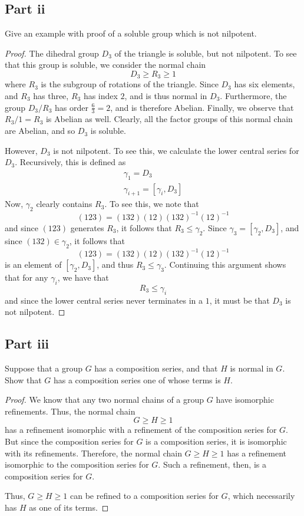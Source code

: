 \documentclass[12pt,reqno]{amsart}
\begin{document}
\subsection*{Part ii}
Give an example with proof of a soluble group which is not nilpotent.
\\
\begin{proof}
The dihedral group $D_3$ of the triangle is soluble, but not nilpotent. To see
    that this group is soluble, we consider the normal chain
    \[
        D_3 \geq R_3 \geq 1
    \]
    where $R_3$ is the subgroup of rotations of the triangle. Since $D_3$ has
    six elements, and $R_3$ has three, $R_3$ has index $2$, and is thus normal
    in $D_3$. Furthermore, the group $D_3/{R_3}$ has order $\frac{6}{3}=2$, and
    is therefore Abelian. Finally, we observe that $R_3/1 = R_3$ is Abelian as
    well. Clearly, all the factor groups of this normal chain are Abelian, and
    so $D_3$ is soluble.

    However, $D_3$ is not nilpotent. To see this, we calculate the lower central
    series for $D_3$. Recursively, this is defined as
    \[
        \begin{aligned}
        \gamma_1 = D_3\\
            \gamma_{i+1} = [\gamma_i,D_3]
        \end{aligned}
    \]
    Now, $\gamma_2$ clearly contains $R_3$. To see this, we note that
    \[
        (123) = (132)(12)(132)^{-1}(12)^{-1}
    \]
    and since $(123)$ generates $R_3$, it follows that $R_3\leq \gamma_2$.
    Since $\gamma_3 = [\gamma_2,D_3]$, and since $(132)\in\gamma_2$, it follows
    that
    \[
        (123) = (132)(12)(132)^{-1}(12)^{-1}
    \]
    is an element of $[\gamma_2,D_3]$, and thus $R_3\leq \gamma_3$. Continuing
    this argument shows that for any $\gamma_i$, we have that
    \[
        R_3\leq \gamma_i
    \]
    and since the lower central series never terminates in a $1$, it must be
    that $D_3$ is not nilpotent.
\end{proof}

\subsection*{Part iii}
Suppose that a group $G$ has a composition series, and that $H$ is normal in
$G$. Show that $G$ has a composition series one of whose terms is $H$.
\\
\begin{proof}
    We know that any two normal chains of a group $G$ have isomorphic
    refinements. Thus, the normal chain
    \[
        G\geq H\geq 1
    \]
    has a refinement isomorphic with a refinement of the composition series for
    $G$. But since the composition series for $G$ is a composition series, it is
    isomorphic with its refinements. Therefore, the normal chain $G\geq H\geq 1$
    has a refinement isomorphic to the composition series for $G$. Such a
    refinement, then, is a composition series for $G$.

    Thus, $G\geq H\geq 1$ can be refined to a composition series for $G$, which
    necessarily has $H$ as one of its terms.
\end{proof}
\end{document}
